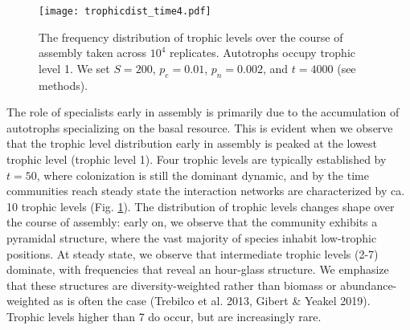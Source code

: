 \documentclass[9pt,twocolumn,twoside]{pnas-new}
\begin{document}
\begin{figure}
\centering
\texttt{[image: trophicdist\_time4.pdf]}
\caption{
The frequency distribution of trophic levels over the course of assembly taken across $10^4$ replicates. Autotrophs occupy trophic level 1.
We set $S=200$, $p_e=0.01$, $p_n=0.002$, and $t=4000$ (see methods).
}
\label{fig:trophic}
\end{figure}

The role of specialists early in assembly is primarily due to the accumulation of autotrophs specializing on the basal resource.
This is evident when we observe that the trophic level distribution early in assembly is peaked at the lowest trophic level (trophic level 1).
Four trophic levels are typically established by $t=50$, where colonization is still the dominant dynamic, and by the time communities reach steady state the interaction networks are characterized by ca. 10 trophic levels (Fig. \ref{fig:trophic}).
The distribution of trophic levels changes shape over the course of assembly: early on, we observe that the community exhibits a pyramidal structure, where the vast majority of species inhabit low-trophic positions.
At steady state, we observe that intermediate trophic levels (2-7) dominate, with frequencies that reveal an hour-glass structure.
We emphasize that these structures are diversity-weighted rather than biomass or abundance-weighted as is often the case (Trebilco et al. 2013, Gibert \& Yeakel 2019).
Trophic levels higher than 7 do occur, but are increasingly rare.
\end{document}
